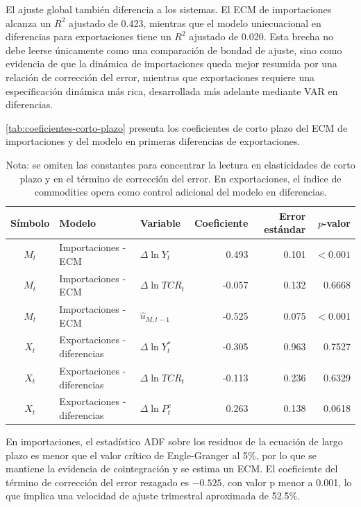 \documentclass[11pt,a4paper]{article}
\begin{document}
	El ajuste global también diferencia a los sistemas. El ECM de importaciones
	alcanza un \(R^2\) ajustado de 0.423, mientras que el modelo uniecuacional en
	diferencias para exportaciones tiene un \(R^2\) ajustado de 0.020. Esta brecha
	no debe leerse únicamente como una comparación de bondad de ajuste, sino como
	evidencia de que la dinámica de importaciones queda mejor resumida por una
	relación de corrección del error, mientras que exportaciones requiere una
	especificación dinámica más rica, desarrollada más adelante mediante VAR en
	diferencias.
	
	\autoref{tab:coeficientes-corto-plazo} presenta los coeficientes de corto plazo
	del ECM de importaciones y del modelo en primeras diferencias de exportaciones.
	
	\begin{table}[H]
		\centering
		\caption{Coeficientes de corto plazo: ECM y primeras diferencias.}
		\label{tab:coeficientes-corto-plazo}
		\scriptsize
		\begin{tabular}{cllrrr}
			\toprule
			Símbolo & Modelo & Variable & Coeficiente & Error estándar & \(p\)-valor \\
			\midrule
			\(M_t\) & Importaciones - ECM & \(\Delta \ln Y_t\) & 0.493 & 0.101 & \(<0.001\) \\
			\(M_t\) & Importaciones - ECM & \(\Delta \ln TCR_t\) & -0.057 & 0.132 & 0.6668 \\
			\(M_t\) & Importaciones - ECM & \(\hat{u}_{M,t-1}\) & -0.525 & 0.075 & \(<0.001\) \\
			\(X_t\) & Exportaciones - diferencias & \(\Delta \ln Y_t^*\) & -0.305 & 0.963 & 0.7527 \\
			\(X_t\) & Exportaciones - diferencias & \(\Delta \ln TCR_t\) & -0.113 & 0.236 & 0.6329 \\
			\(X_t\) & Exportaciones - diferencias & \(\Delta \ln P_t^c\) & 0.263 & 0.138 & 0.0618 \\
			\bottomrule
		\end{tabular}
		\caption*{\footnotesize Nota: se omiten las constantes para concentrar la
			lectura en elasticidades de corto plazo y en el término de corrección del error.
			En exportaciones, el índice de commodities opera como control adicional del
			modelo en diferencias.}
	\end{table}
	
	En importaciones, el estadístico ADF sobre los residuos de la ecuación de largo
	plazo es menor que el valor crítico de Engle-Granger al 5\%, por lo que se
	mantiene la evidencia de cointegración y se estima un ECM. El coeficiente del
	término de corrección del error rezagado es \(-0.525\), con valor p menor a
	0.001, lo que implica una velocidad de ajuste trimestral aproximada de 52.5\%.
	
\end{document}
